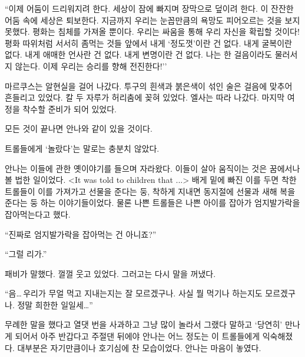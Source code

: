 ``이제 어둠이 드리워지려 한다. 세상이 잠에 빠지며 장막으로 덮이려 한다. 이 잔잔한 어둠 속에 세상은 퇴보한다. 지금까지 우리는 눈꼽만큼의 욕망도 피어오르는 것을 보지 못했다. 평화는 침체를 가져올 뿐이다. 우리는 싸움을 통해 우리 자신을 확립할 것이다! 평화 따위처럼 서서히 좀먹는 것들 앞에서 내게 `정도껏'이란 건 없다. 내게 굴복이란 없다. 내게 애매한 언사란 건 없다. 내게 변명이란 건 없다. 나는 한 걸음이라도 물러서지 않는다. 이제 우리는 승리를 향해 전진한다!''

마르쿠스는 알현실을 걸어 나갔다. 투구의 흰색과 붉은색이 섞인 술은 걸음에 맞추어 흔들리고 있었다. 칼 두 자루가 허리춤에 꽂혀 있었다. 엘사는 따라 나갔다. 마지막 여정을 착수할 준비가 되어 있었다.

모든 것이 끝나면 안나와 같이 있을 것이다.

\textbreak

트롤들에게 `놀랐다'는 말로는 충분치 않았다.

안나는 이들에 관한 옛이야기를 들으며 자라왔다. 이들이 살아 움직이는 것은 꿈에서나 볼 법한 일이었다. <It was told to children that ...> 배게 밑에 빠진 이를 두면 착한 트롤들이 이를 가져가고 선물을 준다는 둥, 착하게 지내면 동지절에 선물과 새해 복을 준다는 둥 하는 이야기들이었다. 물론 나쁜 트롤들은 나쁜 아이를 잡아가 엄지발가락을 잡아먹는다고 했다.

``진짜로 엄지발가락을 잡아먹는 건 아니죠?''

``그럴 리가.''

패비가 말했다. 껄껄 웃고 있었다. 그러고는 다시 말을 꺼냈다.

``음\ldots\,우리가 무얼 먹고 지내는지는 잘 모르겠구나. 사실 뭘 먹기나 하는지도 모르겠구나. 정말 희한한 일일세\ldots''

무례한 말을 했다고 열댓 번을 사과하고 그냥 많이 놀라서 그랬다 말하고 `당연히' 만나게 되어서 아주 반갑다고 주절댄 뒤에야 안나는 어느 정도는 이 트롤들에게 익숙해졌다. 대부분은 자기만큼이나 호기심에 찬 모습이었다. 안나는 마음이 놓였다.


